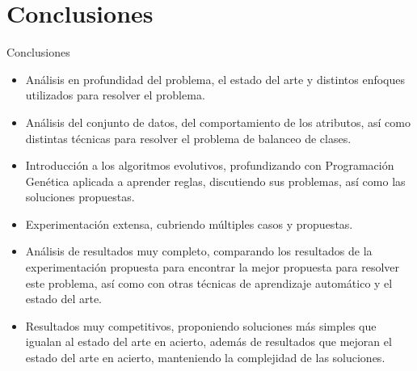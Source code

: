 \documentclass{beamer}
\begin{document}
\section{Conclusiones}
\begin{frame}[allowframebreaks]{Conclusiones}

	\begin{itemize}
		\item Análisis en profundidad del problema, el estado del arte y distintos enfoques utilizados para resolver el problema.
		\item Análisis del conjunto de datos, del comportamiento de los atributos, así como distintas técnicas para resolver el problema de balanceo de clases.
		\item Introducción a los algoritmos evolutivos, profundizando con Programación Genética aplicada a aprender reglas, discutiendo sus problemas, así como las soluciones propuestas.
		\item Experimentación extensa, cubriendo múltiples casos y propuestas.
		\item Análisis de resultados muy completo, comparando los resultados de la experimentación propuesta para encontrar la mejor propuesta para resolver este problema, así como con otras técnicas de aprendizaje automático y el estado del arte.
		\item Resultados muy competitivos, proponiendo soluciones más simples que igualan al estado del arte en acierto, además de resultados que mejoran el estado del arte en acierto, manteniendo la complejidad de las soluciones.
	\end{itemize}

\end{frame}
\end{document}
